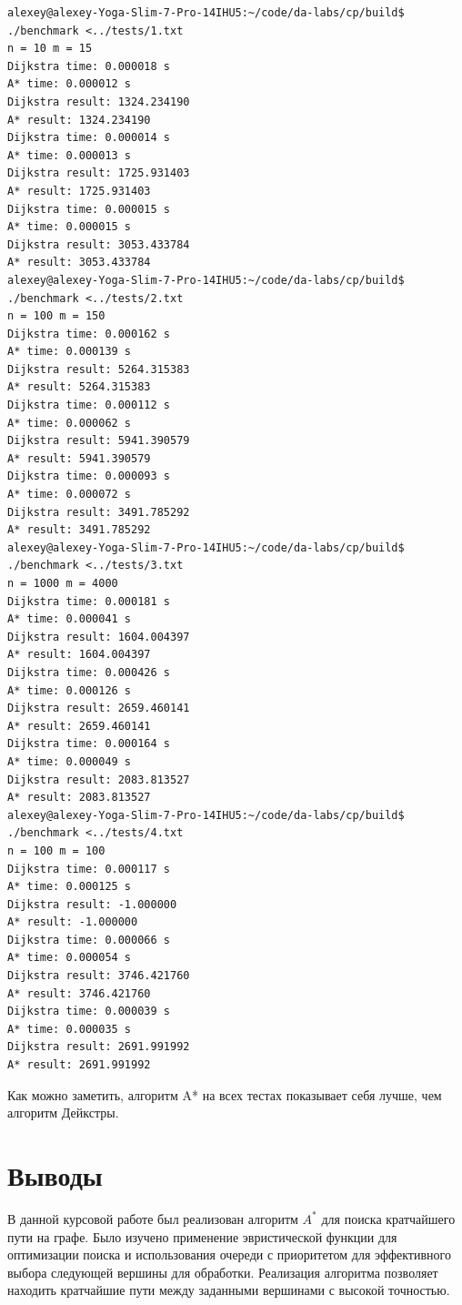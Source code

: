 \documentclass[12pt,a4paper]{article}
\begin{document}
\begin{lstlisting}
alexey@alexey-Yoga-Slim-7-Pro-14IHU5:~/code/da-labs/cp/build$ ./benchmark <../tests/1.txt 
n = 10 m = 15 
Dijkstra time: 0.000018 s
A* time: 0.000012 s
Dijkstra result: 1324.234190
A* result: 1324.234190
Dijkstra time: 0.000014 s
A* time: 0.000013 s
Dijkstra result: 1725.931403
A* result: 1725.931403
Dijkstra time: 0.000015 s
A* time: 0.000015 s
Dijkstra result: 3053.433784
A* result: 3053.433784
alexey@alexey-Yoga-Slim-7-Pro-14IHU5:~/code/da-labs/cp/build$ ./benchmark <../tests/2.txt 
n = 100 m = 150 
Dijkstra time: 0.000162 s
A* time: 0.000139 s
Dijkstra result: 5264.315383
A* result: 5264.315383
Dijkstra time: 0.000112 s
A* time: 0.000062 s
Dijkstra result: 5941.390579
A* result: 5941.390579
Dijkstra time: 0.000093 s
A* time: 0.000072 s
Dijkstra result: 3491.785292
A* result: 3491.785292
alexey@alexey-Yoga-Slim-7-Pro-14IHU5:~/code/da-labs/cp/build$ ./benchmark <../tests/3.txt 
n = 1000 m = 4000 
Dijkstra time: 0.000181 s
A* time: 0.000041 s
Dijkstra result: 1604.004397
A* result: 1604.004397
Dijkstra time: 0.000426 s
A* time: 0.000126 s
Dijkstra result: 2659.460141
A* result: 2659.460141
Dijkstra time: 0.000164 s
A* time: 0.000049 s
Dijkstra result: 2083.813527
A* result: 2083.813527
alexey@alexey-Yoga-Slim-7-Pro-14IHU5:~/code/da-labs/cp/build$ ./benchmark <../tests/4.txt 
n = 100 m = 100 
Dijkstra time: 0.000117 s
A* time: 0.000125 s
Dijkstra result: -1.000000
A* result: -1.000000
Dijkstra time: 0.000066 s
A* time: 0.000054 s
Dijkstra result: 3746.421760
A* result: 3746.421760
Dijkstra time: 0.000039 s
A* time: 0.000035 s
Dijkstra result: 2691.991992
A* result: 2691.991992
\end{lstlisting}
Как можно заметить, алгоритм A* на всех тестах показывает себя лучше, чем алгоритм Дейкстры.
\section*{Выводы}

В данной курсовой работе был реализован алгоритм $A^*$ для поиска кратчайшего пути на графе. Было изучено применение эвристической функции для оптимизации поиска и использования очереди с приоритетом для эффективного выбора следующей вершины для обработки. Реализация алгоритма позволяет находить кратчайшие пути между заданными вершинами с высокой точностью.
\end{document}
